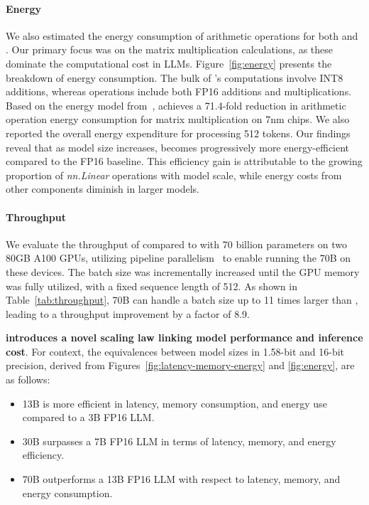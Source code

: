 \paragraph{Energy}

We also estimated the energy consumption of arithmetic operations for both  and . Our primary focus was on the matrix multiplication calculations, as these dominate the computational cost in LLMs. Figure~\ref{fig:energy} presents the breakdown of energy consumption. The bulk of 's computations involve INT8 additions, whereas  operations include both FP16 additions and multiplications. Based on the energy model from~\cite{energycost, pokebnn},  achieves a 71.4-fold reduction in arithmetic operation energy consumption for matrix multiplication on 7nm chips. We also reported the overall energy expenditure for processing 512 tokens. Our findings reveal that as model size increases,  becomes progressively more energy-efficient compared to the FP16  baseline. This efficiency gain is attributable to the growing proportion of \emph{nn.Linear} operations with model scale, while energy costs from other components diminish in larger models.

\paragraph{Throughput}

We evaluate the throughput of  compared to  with 70 billion parameters on two 80GB A100 GPUs, utilizing pipeline parallelism~\cite{gpipe} to enable running the  70B on these devices. The batch size was incrementally increased until the GPU memory was fully utilized, with a fixed sequence length of 512. As shown in Table~\ref{tab:throughput},  70B can handle a batch size up to 11 times larger than , leading to a throughput improvement by a factor of 8.9.

\textbf{ introduces a novel scaling law linking model performance and inference cost}. For context, the equivalences between model sizes in 1.58-bit and 16-bit precision, derived from Figures~\ref{fig:latency-memory-energy} and \ref{fig:energy}, are as follows:

\begin{itemize}
    \item 13B  is more efficient in latency, memory consumption, and energy use compared to a 3B FP16 LLM.
    \item 30B  surpasses a 7B FP16 LLM in terms of latency, memory, and energy efficiency.
    \item 70B  outperforms a 13B FP16 LLM with respect to latency, memory, and energy consumption.
\end{itemize}

